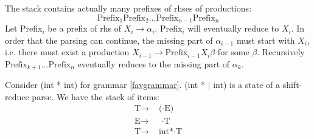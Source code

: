 The stack contains actually many prefixes of rhses of productions:
\begin{equation*}
\text{Prefix}_1\text{Prefix}_2\dots\text{Prefix}_{n-1}\text{Prefix}_{n}
\end{equation*}
Let Prefix$_i$ be a prefix of rhs of $X_i\rightarrow\alpha_i$. Prefix$_i$ will eventually reduce to $X_i$. In order that the parsing can continue, the missing part of $\alpha_{i-1}$ must start with $X_i$, i.e. there must exist a production $X_{i-1}\rightarrow\text{Prefix}_{i-1}X_i\beta$ for some $\beta$. Recursively $\text{Prefix}_{k+1}\dots\text{Prefix}_{n}$ eventually reduces to the missing part of $\alpha_k$.

Consider (int * int) for grammar \eqref{favgrammar}. (int * $|$ int) is a state of a shift-reduce parse. We have the stack of items:
\begin{equation*}
\begin{split}
\text{T}\rightarrow&\text{ (}\cdot\text{E)}\\\text{E}\rightarrow&\text{ }\cdot\text{T}\\\text{T}\rightarrow&\text{ int*}\cdot\text{T}
\end{split}\end{equation*}
